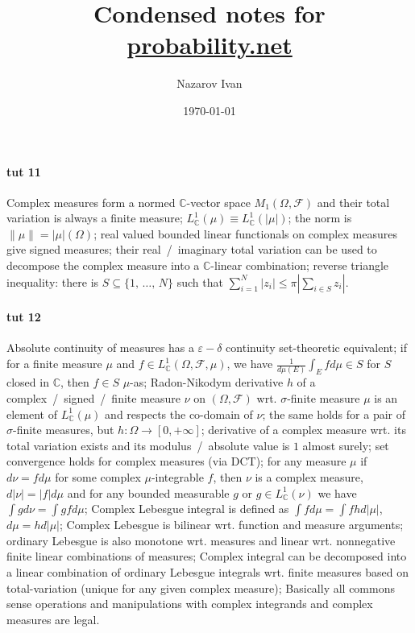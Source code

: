 \documentclass[a4paper]{article}
\title{Condensed notes for \url{probability.net}}
\author{Nazarov Ivan}
\date{\today}
\newcommand{\Fcal}{\mathcal{F}}
\newcommand{\cplx}{\mathbb{C}}
\begin{document}
\maketitle


\paragraph{tut 11} %
\label{par:tut_11}

Complex measures form a normed $\cplx$-vector space $M_1(\Omega, \Fcal)$ and their total variation is always a finite measure;
$L^1_\cplx(\mu) \equiv L^1_\cplx(|\mu|)$;
the norm is $\|\mu\| = |\mu|(\Omega)$;
real valued bounded linear functionals on complex measures give signed measures;
their real~/~imaginary total variation can be used to decompose the complex measure into a $\cplx$-linear combination;
reverse triangle inequality: there is $S \subseteq \{1,\, \ldots,\,N\}$ such that $\sum_{i=1}^N |z_i| \leq \pi |\sum_{i \in S} z_i|$.



\paragraph{tut 12} %
\label{par:tut_12}

Absolute continuity of measures has a $\varepsilon - \delta$ continuity set-theoretic
equivalent;
%
if for a finite measure $\mu$ and $f \in L^1_\cplx(\Omega, \Fcal, \mu)$, we have
$\tfrac1{d\mu(E)} \int_E f d\mu \in S$ for $S$ closed in $\cplx$, then $f \in S$
$\mu$-as;
%
Radon-Nikodym derivative $h$ of a complex~/~signed~/~finite measure $\nu$ on
$(\Omega, \Fcal)$ wrt. $\sigma$-finite measure $\mu$ is an element of $L^1_\cplx(\mu)$
and respects the co-domain of $\nu$;
%
the same holds for a pair of $\sigma$-finite measures, but $h\colon \Omega \to [0, +\infty]$;
%
derivative of a complex measure wrt. its total variation exists and its modulus~/~absolute
value is $1$ almost surely;
%
set convergence holds for complex measures (via DCT);
%
for any measure $\mu$ if $d\nu = f d\mu$ for some complex $\mu$-integrable $f$, then
$\nu$ is a complex measure, $d|\nu| = |f| d\mu$ and for any bounded measurable $g$ or
$g \in L^1_\cplx(\nu)$ we have $\int g d\nu = \int g f d\mu$;
%
Complex Lebesgue integral is defined as $\int f d\mu = \int f h d|\mu|$,
$d\mu = h d|\mu|$;
%
Complex Lebesgue is bilinear wrt. function and measure arguments;
%
ordinary Lebesgue is also monotone wrt. measures and linear wrt. nonnegative finite
linear combinations of measures;
%
Complex integral can be decomposed into a linear combination of ordinary Lebesgue
integrals wrt. finite measures based on total-variation (unique for any given complex
measure);
%
Basically all commons sense operations and manipulations with complex integrands
and complex measures are legal.
\end{document}
